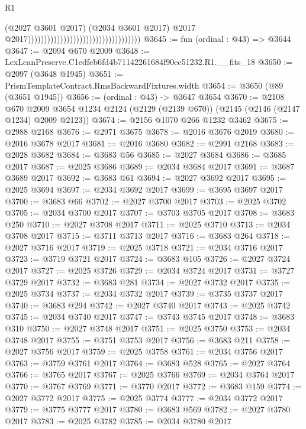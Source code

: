 \begin{lexlean}{R1}
\begin{coremodule}
                                                                          (@2027 @3601 @2017)
                                                                          (@2034 @3601 @2017)
                                                                          @2017
                                                                          @2017)))))))))))))))))))))))))))))))))))
@3645 := fun (ordinal : @43) => @3644
@3647 := @2094 @670 @2009
@3648 := LexLeanPreserve.C1edfeb6fd4b71142261684f90ee51232.R1.__fits_18
@3650 := @2097 (@3648 @1945)
@3651 := PrismTemplateContract.RmsBackwardFixtures.width
@3654 := @3650 (@89 (@3651 @1945))
@3656 := (ordinal : @43) -> @3647 @3654
@3670 := @2108
    @670
    @2009
    @3654
    @1234
    @2124
    (@2129 (@2139 @670))
    (@2145 (@2146 (@2147 @1234) @2009 @2123))
@3674 := @2156 @1070 @266 @1232 @3462
@3675 := @2988 @2168
@3676 := @2971 @3675
@3678 := @2016 @3676 @2019
@3680 := @2016 @3678 @2017
@3681 := @2016 @3680
@3682 := @2991 @2168
@3683 := @2028 @3682
@3684 := @3683 @56
@3685 := @2027 @3684
@3686 := @3685 @2017
@3687 := @2025 @3686
@3689 := @2034 @3684 @2017
@3691 := @3687 @3689 @2017
@3692 := @3683 @61
@3694 := @2027 @3692 @2017
@3695 := @2025 @3694
@3697 := @2034 @3692 @2017
@3699 := @3695 @3697 @2017
@3700 := @3683 @66
@3702 := @2027 @3700 @2017
@3703 := @2025 @3702
@3705 := @2034 @3700 @2017
@3707 := @3703 @3705 @2017
@3708 := @3683 @250
@3710 := @2027 @3708 @2017
@3711 := @2025 @3710
@3713 := @2034 @3708 @2017
@3715 := @3711 @3713 @2017
@3716 := @3683 @264
@3718 := @2027 @3716 @2017
@3719 := @2025 @3718
@3721 := @2034 @3716 @2017
@3723 := @3719 @3721 @2017
@3724 := @3683 @105
@3726 := @2027 @3724 @2017
@3727 := @2025 @3726
@3729 := @2034 @3724 @2017
@3731 := @3727 @3729 @2017
@3732 := @3683 @281
@3734 := @2027 @3732 @2017
@3735 := @2025 @3734
@3737 := @2034 @3732 @2017
@3739 := @3735 @3737 @2017
@3740 := @3683 @294
@3742 := @2027 @3740 @2017
@3743 := @2025 @3742
@3745 := @2034 @3740 @2017
@3747 := @3743 @3745 @2017
@3748 := @3683 @310
@3750 := @2027 @3748 @2017
@3751 := @2025 @3750
@3753 := @2034 @3748 @2017
@3755 := @3751 @3753 @2017
@3756 := @3683 @211
@3758 := @2027 @3756 @2017
@3759 := @2025 @3758
@3761 := @2034 @3756 @2017
@3763 := @3759 @3761 @2017
@3764 := @3683 @528
@3765 := @2027 @3764
@3766 := @3765 @2017
@3767 := @2025 @3766
@3769 := @2034 @3764 @2017
@3770 := @3767 @3769
@3771 := @3770 @2017
@3772 := @3683 @159
@3774 := @2027 @3772 @2017
@3775 := @2025 @3774
@3777 := @2034 @3772 @2017
@3779 := @3775 @3777 @2017
@3780 := @3683 @569
@3782 := @2027 @3780 @2017
@3783 := @2025 @3782
@3785 := @2034 @3780 @2017

\end{coremodule}
\end{lexlean}
